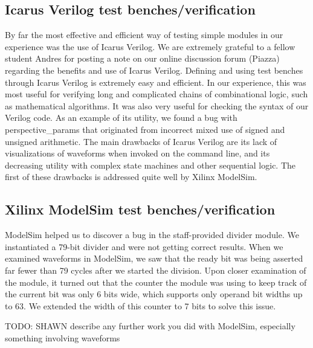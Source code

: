 \documentclass{article}
\begin{document}
\subsection{Icarus Verilog test benches/verification}
By far the most effective and efficient way of testing simple modules in our experience was the use of Icarus Verilog.
We are extremely grateful to a fellow student Andres for posting a note on our online discussion forum (Piazza) regarding the benefits and use of Icarus Verilog.
Defining and using test benches through Icarus Verilog is extremely easy and efficient.
In our experience, this was most useful for verifying long and complicated chains of combinational logic, such as mathematical algorithms.
It was also very useful for checking the syntax of our Verilog code.
As an example of its utility, we found a bug with perspective\_params that originated from incorrect mixed use of signed and unsigned arithmetic.
The main drawbacks of Icarus Verilog are its lack of visualizations of waveforms when invoked on the command line,
and its decreasing utility with complex state machines and other sequential logic.
The first of these drawbacks is addressed quite well by Xilinx ModelSim.

\subsection{Xilinx ModelSim test benches/verification}
ModelSim helped us to discover a bug in the staff-provided divider module. We instantiated a 79-bit divider and were not getting correct results. When we examined waveforms in ModelSim, we saw that the ready bit was being asserted far fewer than 79 cycles after we started the division. Upon closer examination of the module, it turned out that the counter the module was using to keep track of the current bit was only 6 bits wide, which supports only operand bit widths up to 63. We extended the width of this counter to 7 bits to solve this issue.

TODO: SHAWN describe any further work you did with ModelSim, especially something involving waveforms 
\end{document}
